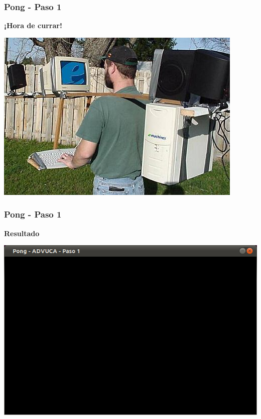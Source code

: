 
\begin{frame}
	\frametitle{Pong - Paso 1}
	
    \begin{center}
        \textbf{¡Hora de currar!}
    \end{center}
	
    \begin{center}
		\includegraphics[scale=0.4]{img/currar-1.jpg}
	\end{center}	

\end{frame}

\begin{frame}
	\frametitle{Pong - Paso 1}
	
    \begin{center}
        \textbf{Resultado}
    \end{center}
	
    \begin{center}
		\includegraphics[scale=0.4]{img/pong-advuca-1.png}
	\end{center}	

\end{frame}

